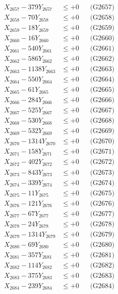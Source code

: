 \documentclass[a4paper,10pt]{article}
\begin{document}
{\begin{align}
X_{2657} - 379Y_{2657} &\leq +0 && \text{(G2657)} \\
X_{2658} - 70Y_{2658} &\leq +0 && \text{(G2658)} \\
X_{2659} - 18Y_{2659} &\leq +0 && \text{(G2659)} \\
X_{2660} - 16Y_{2660} &\leq +0 && \text{(G2660)} \\
\allowbreak
X_{2661} - 540Y_{2661} &\leq +0 && \text{(G2661)} \\
X_{2662} - 586Y_{2662} &\leq +0 && \text{(G2662)} \\
X_{2663} - 1138Y_{2663} &\leq +0 && \text{(G2663)} \\
X_{2664} - 550Y_{2664} &\leq +0 && \text{(G2664)} \\
X_{2665} - 61Y_{2665} &\leq +0 && \text{(G2665)} \\
X_{2666} - 284Y_{2666} &\leq +0 && \text{(G2666)} \\
X_{2667} - 525Y_{2667} &\leq +0 && \text{(G2667)} \\
X_{2668} - 530Y_{2668} &\leq +0 && \text{(G2668)} \\
X_{2669} - 532Y_{2669} &\leq +0 && \text{(G2669)} \\
X_{2670} - 1314Y_{2670} &\leq +0 && \text{(G2670)} \\
\allowbreak
X_{2671} - 158Y_{2671} &\leq +0 && \text{(G2671)} \\
X_{2672} - 402Y_{2672} &\leq +0 && \text{(G2672)} \\
X_{2673} - 843Y_{2673} &\leq +0 && \text{(G2673)} \\
X_{2674} - 339Y_{2674} &\leq +0 && \text{(G2674)} \\
X_{2675} - 11Y_{2675} &\leq +0 && \text{(G2675)} \\
X_{2676} - 121Y_{2676} &\leq +0 && \text{(G2676)} \\
X_{2677} - 67Y_{2677} &\leq +0 && \text{(G2677)} \\
X_{2678} - 24Y_{2678} &\leq +0 && \text{(G2678)} \\
X_{2679} - 1314Y_{2679} &\leq +0 && \text{(G2679)} \\
X_{2680} - 69Y_{2680} &\leq +0 && \text{(G2680)} \\
\allowbreak
X_{2681} - 357Y_{2681} &\leq +0 && \text{(G2681)} \\
X_{2682} - 114Y_{2682} &\leq +0 && \text{(G2682)} \\
X_{2683} - 375Y_{2683} &\leq +0 && \text{(G2683)} \\
X_{2684} - 239Y_{2684} &\leq +0 && \text{(G2684)} \\

\end{align}}
\end{document}
